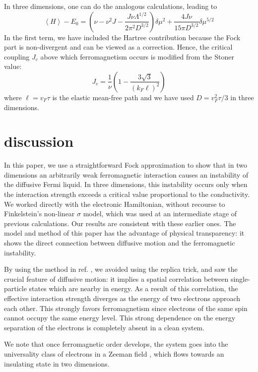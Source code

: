 \documentclass[prb,twocolumn]{revtex4}
\begin{document}
In three dimensions, one can do the analogous calculations, leading to
\begin{equation}
\left\langle H \right\rangle - {E_0} = \left(\nu-{\nu^2}J-\frac{J\nu\Lambda^{1/2}}{2\pi^2D^{3/2}}\right)
{\delta\!\mu^2} + \frac{4J\nu}{15\pi D^{3/2}}{\delta\!\mu^{5/2}}
\end{equation}
In the first term, we have included the Hartree contribution because the
Fock part is non-divergent and can be viewed as a correction.
Hence, the critical coupling $J_c$ above which ferromagnetism
occurs is modified from the Stoner value:
\begin{equation}
{J_c} = \frac{1}{\nu}\left(1 - \frac{3\sqrt{3}}{\left({k_F}\ell\right)^2}\right)
\end{equation}
where $\ell={v_F}\tau$ is the elastic mean-free path and we have
used $D={v_F^2}\tau/3$ in three dimensions.

\section{discussion}

In this paper, we use a straightforward Fock approximation
to show that in two dimensions an arbitrarily weak ferromagnetic
interaction causes an instability of the diffusive Fermi liquid.
In three dimensions, this instability occurs only when the interaction
strength exceeds a critical value proportional to the
conductivity. We worked directly with the electronic Hamiltonian,
without recourse to Finkelstein's non-linear $\sigma$ model,
which was used at an intermediate stage of previous
calculations\cite{Belitz,Chamon,Nayak}. Our results are
consistent with these earlier ones.
The model and method of this paper has the
advantage of physical transparency: it shows the
direct connection between diffusive motion and the
ferromagnetic instability.

By using the method in ref. ,
we avoided using the replica trick, and saw the crucial
feature of diffusive motion: it implies a spatial correlation
between single-particle states which are nearby in energy.
As a result of this correlation, the effective interaction strength
diverges as the energy of two electrons approach each other.
This strongly favors ferromagnetism since electrons of the same
spin cannot occupy the same energy level. This strong dependence on
the energy separation of the electrons is completely absent in a
clean system.

We note that once ferromagnetic order develops, the system
goes into the universality class of electrons in a Zeeman field
\cite{Castellani}, which flows towards an insulating state in two dimensions.
\end{document}
